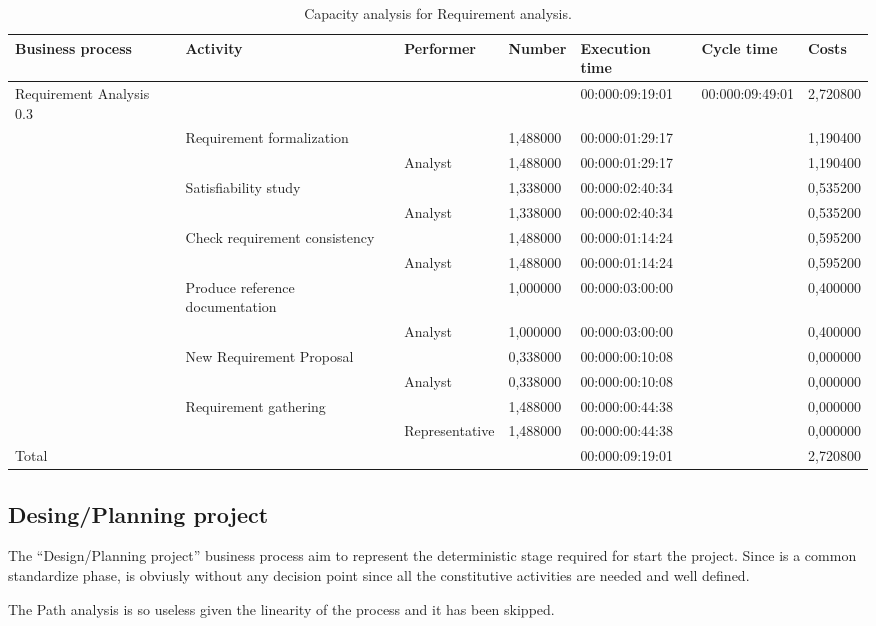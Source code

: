 \begin{landscape}
\begin{table}
\centering
{\tiny
\begin{tabular}{|l|l|l|l|l|l|l|}
Business process&Activity&Performer&Number&Execution time&Cycle time&Costs\\
\hline
Requirement Analysis 0.3&&&&00:000:09:19:01&00:000:09:49:01&2,720800\\
\hline
&Requirement formalization &&1,488000&00:000:01:29:17&&1,190400\\
\hline
&&Analyst &1,488000&00:000:01:29:17&&1,190400\\
\hline
&Satisfiability study &&1,338000&00:000:02:40:34&&0,535200\\
\hline
&&Analyst &1,338000&00:000:02:40:34&&0,535200\\
\hline
&Check requirement consistency &&1,488000&00:000:01:14:24&&0,595200\\
\hline
&&Analyst &1,488000&00:000:01:14:24&&0,595200\\
\hline
&Produce reference documentation &&1,000000&00:000:03:00:00&&0,400000\\
\hline
&&Analyst &1,000000&00:000:03:00:00&&0,400000\\
\hline
&New Requirement Proposal &&0,338000&00:000:00:10:08&&0,000000\\
\hline
&&Analyst &0,338000&00:000:00:10:08&&0,000000\\
\hline
&Requirement gathering &&1,488000&00:000:00:44:38&&0,000000\\
\hline
&&Representative &1,488000&00:000:00:44:38&&0,000000\\
\hline
Total&&&&00:000:09:19:01&&2,720800
\end{tabular}
}
\caption{Capacity analysis for Requirement analysis.}
\end{table}
\end{landscape}
%

%

\subsection{Desing/Planning project}
The ``Design/Planning project'' business process aim to represent the deterministic stage required for start the project. Since is a common standardize phase, is obviusly without any decision point since all the constitutive activities are needed and well defined. 

The Path analysis is so useless given the linearity of the process and it has been skipped.

